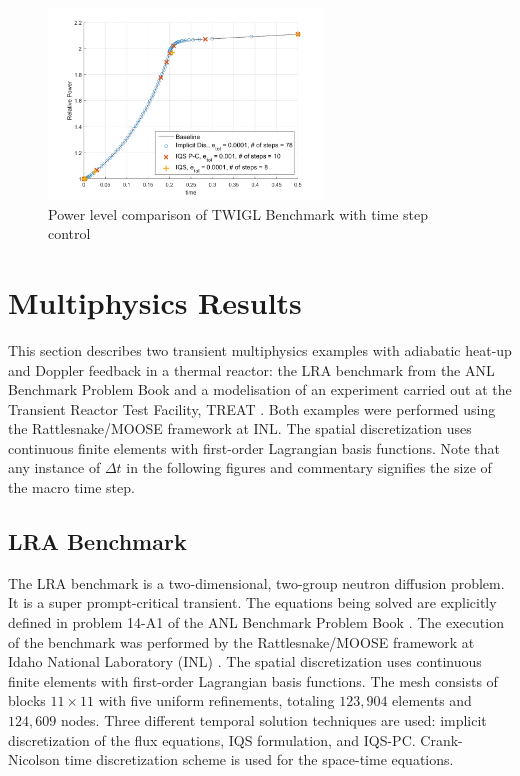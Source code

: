 \documentclass{elsarticle}
\newcommand{\iqspc}{IQS-PC\xspace}
\begin{document}
\begin{figure}[!htbp]
\centering
\includegraphics[height=2in]{figures/TWIGL_power_plot_dt2.png}
\caption{Power level comparison of TWIGL Benchmark with time step control}
\label{fig:TWIGL_power_dt2}
\end{figure}

\section{Multiphysics Results}

This section describes two transient multiphysics examples with adiabatic heat-up and Doppler feedback in a thermal reactor: the LRA benchmark from the  ANL Benchmark Problem Book \cite{ANL_BPB} 
and a modelisation of an experiment carried out at the Transient Reactor Test Facility, TREAT \cite{mammoth, Tran15}. 
Both examples were performed using the Rattlesnake/MOOSE framework at INL. The spatial discretization uses continuous finite elements with first-order Lagrangian basis functions.
Note that any instance of $\Delta t$ in the following figures and commentary signifies the size of the macro time step.

\subsection{LRA Benchmark}

The LRA benchmark is a two-dimensional, two-group neutron diffusion problem.  
It is a super prompt-critical transient. The equations being solved are explicitly defined in problem 14-A1 of the ANL Benchmark Problem Book \cite{ANL_BPB}. The execution of the benchmark was performed by the Rattlesnake/MOOSE framework at Idaho National Laboratory (INL) \cite{wang2013}.  The spatial discretization uses continuous finite elements with first-order Lagrangian basis functions. The mesh consists of blocks $11\times 11$ with five uniform refinements, totaling $123,904$ elements and $124,609$ nodes. Three different temporal solution techniques are used: implicit discretization of the flux equations, IQS formulation, and \iqspc. Crank-Nicolson time discretization scheme is used for the space-time equations. 
\end{document}

